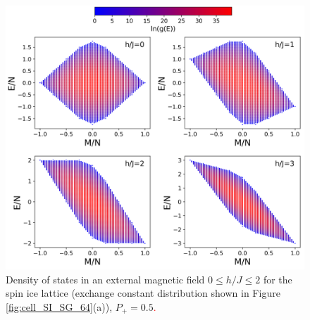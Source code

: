 \documentclass[preprint,12pt]{elsarticle}
\begin{document}
	\begin{figure}[H]
		\centering
		\includegraphics[width=1\linewidth]{pictures/HDOS_SI_64_J0_1.png}
		\caption{Density of states in an external magnetic field $0\leq h/J \leq 2$ for the spin ice lattice (exchange constant distribution shown in Figure \ref{fig:cell_SI_SG_64}(a)), $P_+ = 0.5$\textcolor{red}{.}}
		\label{fig:HDOS_ice_1}
	\end{figure}
	
\end{document}
